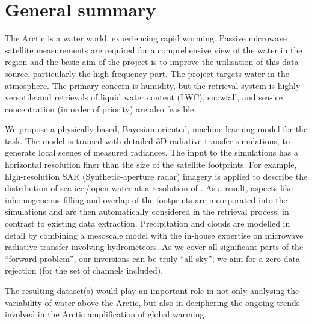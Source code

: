 \documentclass[12pt,oneside,a4paper]{article}
\begin{document}
	
	
	\thispagestyle{empty}
	\vspace*{-10mm}
	\noindent
	\textbf{\Large \LongTitle}




\section{General summary}
%
The Arctic is a water world, experiencing rapid warming. Passive microwave
satellite measurements are required for a comprehensive view of the water in the region and the basic aim of the project is to improve the utilisation of this data source, particularly the high-frequency part. The project targets water in the atmosphere. The primary concern is humidity, but
the retrieval system is highly versatile and retrievals of liquid water  content (LWC), snowfall, and sea-ice concentration (in order of priority) are also
feasible.

We propose a physically-based, Bayesian-oriented, machine-learning model for
the task. The model is trained with detailed 3D radiative transfer simulations,
to generate local scenes of measured radiances. The input to the simulations
has a horizontal resolution finer than the size of the satellite footprints.
For example, high-resolution SAR (Synthetic-aperture radar) imagery is applied to describe the
distribution of sea-ice\,/\,open water at a resolution of . As a result,
aspects like inhomogeneous filling and overlap of the footprints are
incorporated into the simulations and are then automatically considered in the
retrieval process, in contrast to existing data extraction. Precipitation and
clouds are modelled in detail by combining a mesoscale model with the in-house
expertise on microwave radiative transfer involving hydrometeors. As we cover
all significant parts of the ``forward problem'', our inversions can be truly
``all-sky''; we aim for a zero data rejection (for the set of channels
included).

The resulting dataset(s) would play an important role in not only analysing the
variability of water above the Arctic, but also in deciphering the
ongoing trends involved in the Arctic amplification of global warming.
\end{document}
